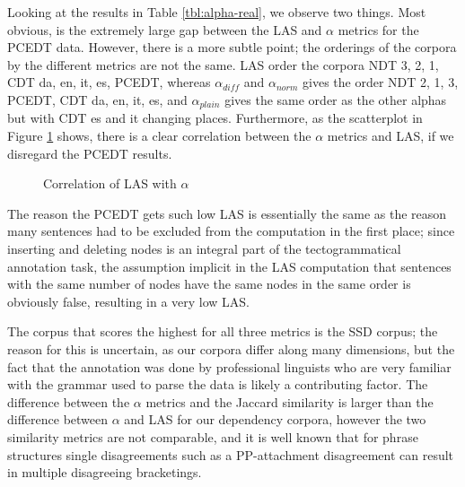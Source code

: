\documentclass[11pt]{article}
\begin{document}
Looking at the results in Table \ref{tbl:alpha-real}, we observe two things.
Most obvious, is the extremely large gap between the LAS and $\alpha$ metrics
for the PCEDT data. However, there is a more subtle point; the orderings of
the corpora by the different metrics are not the same. LAS order the corpora
NDT 3, 2, 1, CDT da, en, it, es, PCEDT, whereas $\alpha_{diff}$ and
$\alpha_{norm}$ gives the order NDT 2, 1, 3, PCEDT, CDT da, en, it, es, and
$\alpha_{plain}$ gives the same order as the other alphas but with CDT es and
it changing places. Furthermore, as the scatterplot in Figure
\ref{fig:correlations} shows, there is a clear correlation between the
$\alpha$ metrics and LAS, if we disregard the PCEDT results.

\begin{figure}
    \begin{center}
        
    \end{center}
	\caption{Correlation of LAS with $\alpha$}
	\label{fig:correlations}
\end{figure}

The reason the PCEDT gets such low LAS is essentially the same as the reason
many sentences had to be excluded from the computation in the first place;
since inserting and deleting nodes is an integral part of the tectogrammatical
annotation task, the assumption implicit in the LAS computation that sentences
with the same number of nodes have the same nodes in the same order is
obviously false, resulting in a very low LAS.

The corpus that scores the highest for all three metrics is the SSD corpus;
the reason for this is uncertain, as our corpora differ along many dimensions,
but the fact that the annotation was done by professional linguists who are
very familiar with the grammar used to parse the data is likely a contributing
factor. The difference between the $\alpha$ metrics and the Jaccard similarity
is larger than the difference between $\alpha$ and LAS for our dependency
corpora, however the two similarity metrics are not comparable, and it is well
known that for phrase structures single disagreements such as a PP-attachment
disagreement can result in multiple disagreeing bracketings.

\end{document}
